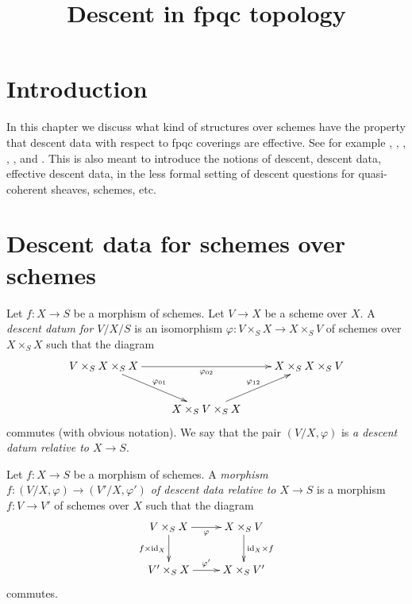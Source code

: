 

%


\title{Descent in fpqc topology}

\maketitle

\tableofcontents

\section{Introduction}
\label{section-introduction}

\noindent
In this chapter we discuss what kind of structures over schemes
have the property that descent data with respect to fpqc coverings
are effective. See for example \cite{Gr-I}, \cite{Gr-II}, \cite{Gr-III},
\cite{Gr-IV}, \cite{Gr-V}, and \cite{Gr-VI}.
This is also meant to introduce the notions of
descent, descent data, effective descent data, in the less formal
setting of descent questions for quasi-coherent sheaves, schemes, etc.


\section{Descent data for schemes over schemes}
\label{section-descent-datum}

\begin{definition}
\label{definition-descent-datum}
Let $f : X \to S$ be a morphism of schemes.
Let $V \to X$ be a scheme over $X$.
A {\it descent datum for $V/X/S$} is an isomorphism
$\varphi : V \times_S X \to X \times_S V$ of schemes over
$X \times_S X$ such that the diagram
$$
\xymatrix{
V \times_S X \times_S X \ar[rd]^{\varphi_{01}} \ar[rr]_{\varphi_{02}} &
&
X \times_S X \times_S V\\
&
X \times_S V \times_S X \ar[ru]^{\varphi_{12}}
}
$$
commutes (with obvious notation).
We say that the pair $(V/X, \varphi)$ is
{\it a descent datum relative to $X \to S$}.
\end{definition}

\begin{definition}
\label{definition-morphism-descent-data}
Let $f : X \to S$ be a morphism of schemes.
A {\it morphism $f : (V/X, \varphi) \to (V'/X, \varphi')$ of
descent data relative to $X \to S$} is a morphism
$f : V \to V'$ of schemes over $X$ such that 
the diagram
$$
\xymatrix{
V \times_S X \ar[r]_{\varphi} \ar[d]_{f \times \text{id}_X} &
X \times_S V \ar[d]^{\text{id}_X \times f} \\
V' \times_S X \ar[r]^{\varphi'} & X \times_S V'
}
$$
commutes.
\end{definition}

